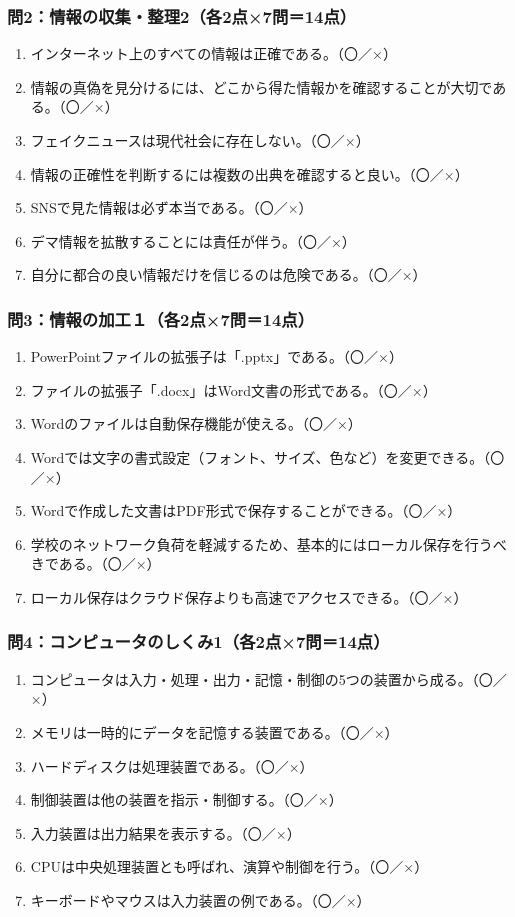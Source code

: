 \documentclass[a4paper,6pt,twoside]{jsarticle}
\newcommand{\OX}{\hfill（〇／×）}
\begin{document}
\subsubsection*{問2：情報の収集・整理2（各2点×7問＝14点）}
\begin{enumerate}
\item インターネット上のすべての情報は正確である。\OX
\item 情報の真偽を見分けるには、どこから得た情報かを確認することが大切である。\OX
\item フェイクニュースは現代社会に存在しない。\OX
\item 情報の正確性を判断するには複数の出典を確認すると良い。\OX
\item SNSで見た情報は必ず本当である。\OX
\item デマ情報を拡散することには責任が伴う。\OX
\item 自分に都合の良い情報だけを信じるのは危険である。\OX
\end{enumerate}

\subsubsection*{問3：情報の加工１（各2点×7問＝14点）}
\begin{enumerate}
\item PowerPointファイルの拡張子は「.pptx」である。\OX
\item ファイルの拡張子「.docx」はWord文書の形式である。\OX
\item Wordのファイルは自動保存機能が使える。\OX
\item Wordでは文字の書式設定（フォント、サイズ、色など）を変更できる。\OX
\item Wordで作成した文書はPDF形式で保存することができる。\OX
\item 学校のネットワーク負荷を軽減するため、基本的にはローカル保存を行うべきである。\OX
\item ローカル保存はクラウド保存よりも高速でアクセスできる。\OX
\end{enumerate}

\subsubsection*{問4：コンピュータのしくみ1（各2点×7問＝14点）}
\begin{enumerate}
\item コンピュータは入力・処理・出力・記憶・制御の5つの装置から成る。\OX
\item メモリは一時的にデータを記憶する装置である。\OX
\item ハードディスクは処理装置である。\OX
\item 制御装置は他の装置を指示・制御する。\OX
\item 入力装置は出力結果を表示する。\OX
\item CPUは中央処理装置とも呼ばれ、演算や制御を行う。\OX
\item キーボードやマウスは入力装置の例である。\OX
\end{enumerate}
\end{document}
